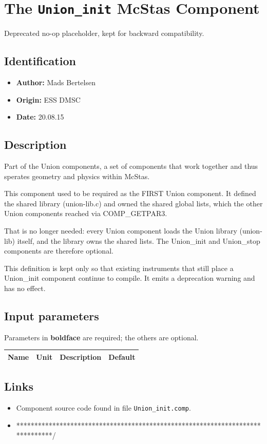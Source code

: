 \section{The \texttt{Union\_init} McStas Component}
Deprecated no-op placeholder, kept for backward compatibility.

\subsection*{Identification}
\begin{itemize}
  \item \textbf{Author:} Mads Bertelsen
  \item \textbf{Origin:} ESS DMSC
  \item \textbf{Date:} 20.08.15
\end{itemize}

\subsection*{Description}
Part of the Union components, a set of components that work together and thus sperates geometry and physics within McStas.

This component used to be required as the FIRST Union component. It defined the shared library (union-lib.c) and owned the shared global lists, which the other Union components reached via COMP\_GETPAR3.

That is no longer needed: every Union component loads the Union library (union-lib) itself, and the library owns the shared lists. The Union\_init and Union\_stop components are therefore optional.

This definition is kept only so that existing instruments that still place a Union\_init component continue to compile. It emits a deprecation warning and has no effect.

\subsection*{Input parameters}
Parameters in \textbf{boldface} are required; the others are optional.

\begin{longtable}{p{}p{}p{}p{}}
\toprule
\textbf{Name} & \textbf{Unit} & \textbf{Description} & \textbf{Default} \\
\midrule
\endhead
\bottomrule
\end{longtable}

\subsection*{Links}
\begin{itemize}
  \item Component source code found in file \texttt{Union\_init.comp}.
  \item ******************************************************************************/
\end{itemize}
